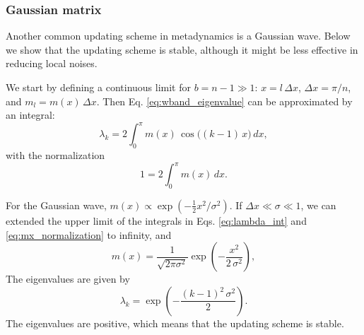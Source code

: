 \documentclass[reprint]{revtex4-1}
\begin{document}
\subsubsection{Gaussian matrix}



Another common updating scheme
in metadynamics is a Gaussian wave.
%
Below we show that the updating scheme
is stable, although
it might be less effective
in reducing local noises.



We start by defining
a continuous limit
for $b = n - 1 \gg 1$:
$x = l \, \Delta x$,
$\Delta x = \pi/n$,
and
$m_l = m(x) \, \Delta x$.
%
Then
Eq. \eqref{eq:wband_eigenvalue}
can be approximated by an integral:
%
\begin{equation}
\lambda_k
=
2 \int_0^\pi
  m(x) \, \cos \bigl( (k-1) \, x \bigr) \, dx,
\label{eq:lambda_int}
\end{equation}
%
with the normalization
%
\begin{equation}
1 = 2 \int_0^\pi m(x) \, dx.
\label{eq:mx_normalization}
\end{equation}



For the Gaussian wave,
$m(x) \propto \exp(-\frac{1}{2} x^2/\sigma^2)$.
%
If $\Delta x \ll \sigma \ll 1$,
we can extended
the upper limit of the integrals
in Eqs. \eqref{eq:lambda_int}
and \eqref{eq:mx_normalization}
to infinity, and
%
\begin{equation}
m(x)
=
\frac{            1            }
     { \sqrt{ 2 \pi \sigma^2 } }
%
\exp\left(
      -\frac{       x^2     }
            { 2 \, \sigma^2 }
    \right),
\end{equation}
%
%
The eigenvalues are given by
%
\begin{equation}
\lambda_k
=
\exp\left(
      -\frac{ (k - 1)^2 \, \sigma^2 }
            {           2           }
    \right).
\label{eq:lambda_Gaussian}
\end{equation}
%
The eigenvalues are positive,
which means that the updating scheme
is stable.
\end{document}
